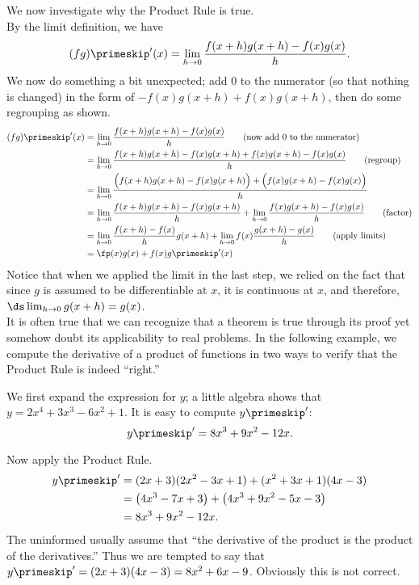 We now investigate why the Product Rule is true.\\

{By the limit definition, we have 
\[
(fg)\primeskip'(x) =\lim_{h\to0} \frac{f(x+h)g(x+h)-f(x)g(x)}{h}.
\]
We now do something a bit unexpected; add 0 to the numerator (so that nothing is changed) in the form of $-f(x)g(x+h)+f(x)g(x+h)$, then do some regrouping as shown.
		\small
		\begin{align*}
		(fg)\primeskip'(x) &=\lim_{h\to 0} \frac{f(x+h)g(x+h)-f(x)g(x)}{h} \tag{now add 0 to the numerator}\\
  &=	\lim_{h\to 0} \frac{f(x+h)g(x+h)-f(x)g(x+h)+f(x)g(x+h)-f(x)g(x)}{h} \tag{regroup} \\
  &=	\lim_{h\to 0} \frac{\Big(f(x+h)g(x+h)-f(x)g(x+h)\Big)+\Big(f(x)g(x+h)-f(x)g(x)\Big)}{h}\\
  &=	\lim_{h\to 0} \frac{f(x+h)g(x+h)-f(x)g(x+h)}{h}+\lim_{h\to 0}\frac{f(x)g(x+h)-f(x)g(x)}{h} \tag{factor}\\
  &=\lim_{h\to 0} \frac{f(x+h)-f(x)}{h}g(x+h)+\lim_{h\to 0} f(x)\frac{g(x+h)-g(x)}{h}\tag{apply limits}\\
  &=\fp(x)g(x) + f(x)g\primeskip'(x)
		\end{align*}
		\normalsize
Notice that when we applied the limit in the last step, we relied on the fact that since $g$ is assumed to be differentiable at $x$, it is continuous at $x$, and therefore, $\ds \lim_{h\to 0}g(x+h) = g(x)$.
}\\

It is often true that we can recognize that a theorem is true through its proof yet somehow doubt its applicability to real problems. In the following example, we compute the derivative of a product of functions in two ways to verify that the Product Rule is indeed ``right.''\\

{We first expand the expression for $y$; a little algebra shows that $y = 2x^4+3x^3-6x^2+1$. It is easy to compute $y\primeskip'$: 
\[
y\primeskip' = 8x^3+9x^2-12x.
\]

Now apply the Product Rule. 
\begin{align*}
y\primeskip' &= (2x+3)(2x^2-3x+1) + (x^2+3x+1)(4x-3)\\
			 &= \big(4x^3-7x+3\big) + \big(4x^3+9x^2-5x-3\big)\\
			 & = 8x^3+9x^2-12x.
			\end{align*}
The uninformed usually assume that ``the derivative of the product is the product of the derivatives.'' Thus we are tempted to say that $y\primeskip' = (2x+3)(4x-3) = 8x^2+6x-9$. Obviously this is not correct.
}\\

